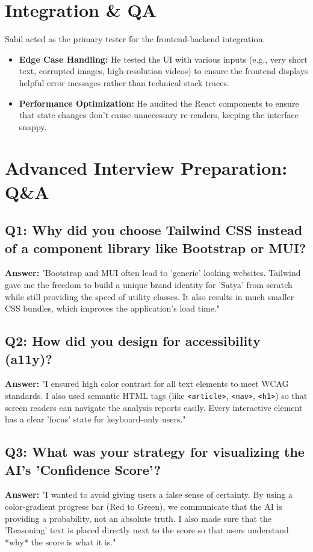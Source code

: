 \documentclass[12pt]{article}
\begin{document}
\section{Integration & QA}
Sahil acted as the primary tester for the frontend-backend integration. 
\begin{itemize}
    \item \textbf{Edge Case Handling:} He tested the UI with various inputs (e.g., very short text, corrupted images, high-resolution videos) to ensure the frontend displays helpful error messages rather than technical stack traces.
    \item \textbf{Performance Optimization:} He audited the React components to ensure that state changes don't cause unnecessary re-renders, keeping the interface snappy.
\end{itemize}

\section{Advanced Interview Preparation: Q&A}

\subsection{Q1: Why did you choose Tailwind CSS instead of a component library like Bootstrap or MUI?}
\textbf{Answer:} "Bootstrap and MUI often lead to 'generic' looking websites. Tailwind gave me the freedom to build a unique brand identity for 'Satya' from scratch while still providing the speed of utility classes. It also results in much smaller CSS bundles, which improves the application's load time."

\subsection{Q2: How did you design for accessibility (a11y)?}
\textbf{Answer:} "I ensured high color contrast for all text elements to meet WCAG standards. I also used semantic HTML tags (like \texttt{<article>}, \texttt{<nav>}, \texttt{<h1>}) so that screen readers can navigate the analysis reports easily. Every interactive element has a clear 'focus' state for keyboard-only users."

\subsection{Q3: What was your strategy for visualizing the AI's 'Confidence Score'?}
\textbf{Answer:} "I wanted to avoid giving users a false sense of certainty. By using a color-gradient progress bar (Red to Green), we communicate that the AI is providing a probability, not an absolute truth. I also made sure that the 'Reasoning' text is placed directly next to the score so that users understand *why* the score is what it is."
\end{document}
